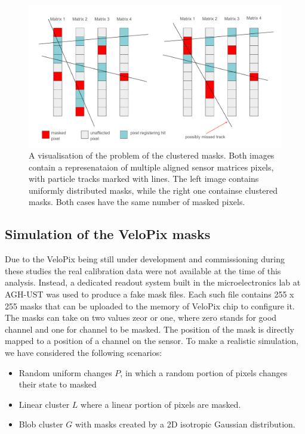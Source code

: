 \begin{figure}[h]
\centering
\includegraphics[width=\textwidth]{figures/chapter4/velopix_clusters/pixel clusters.pdf}
\caption{A visualisation of the problem of the clustered masks. Both images contain a represenataion of multiple aligned sensor matrices pixels, with particle tracks marked with lines. The left image contains uniformly distributed masks, while the right one containse clustered masks. Both cases have the same number of masked pixels.}
\label{fig:cluster_masks}
\end{figure}

\subsection{Simulation of the VeloPix masks}

Due to the VeloPix being still under development and commissioning during these studies the real calibration data  were not available at the time of this analysis. Instead, a dedicated readout system built in the microelectronics lab at AGH-UST was used to produce a fake mask files. Each such file contains 255 x 255 masks that can be uploaded to the memory of VeloPix chip to configure it. The masks can take on two values zeor or one, where zero stands for good channel and one for channel to be masked. The position of the mask is directly mapped to a position of a channel on the sensor.
To make a realistic simulation, we have considered the following scenarios:

\begin{itemize}[noitemsep]
  \item Random uniform changes $P$, in which a random portion of pixels changes their state to masked
  \item Linear cluster $L$ where a linear portion of pixels are masked.
  \item Blob cluster $G$ with masks created by a 2D isotropic Gaussian distribution.
\end{itemize}

